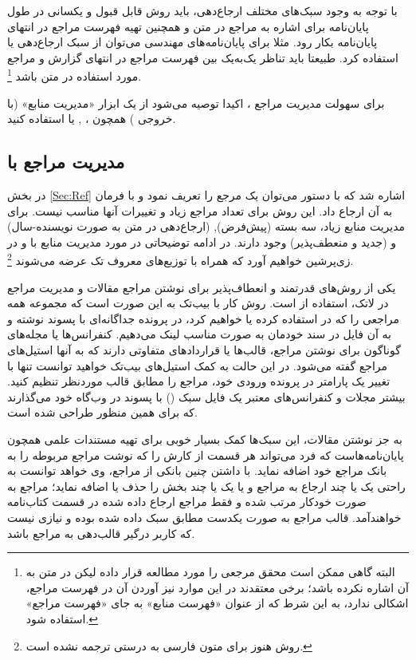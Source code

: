 با توجه به وجود سبک‌های مختلف ارجاع‌دهی، باید
روش قابل قبول و یکسانی
در طول پایان‌نامه برای اشاره به مراجع در متن و همچنین تهیه فهرست مراجع در انتهای پایان‌نامه بکار رود. مثلا برای پایان‌نامه‌های مهندسی می‌توان از سبک ارجاع‌دهی
%
یا
استفاده کرد. طبیعتا باید تناظر یک‌به‌یک بین فهرست مراجع در انتهای گزارش و مراجع مورد استفاده در متن باشد%
\footnote{البته گاهی ممکن است محقق مرجعی را مورد مطالعه قرار داده لیکن در متن به آن اشاره نکرده باشد؛ برخی معتقدند در این موارد نیز آوردن آن در فهرست مراجع، اشکالی ندارد، به این شرط که از عنوان «فهرست منابع» به جای «فهرست مراجع» استفاده شود.}.

برای سهولت مدیریت مراجع \پ%
، اکیدا توصیه می‌شود از یک ابزار «مدیریت منابع» (با خروجی
\texorpdfstring{}{Bib\TeX}%
) همچون
،
,
یا
استفاده کنید.

\subsection{ مدیریت مراجع با \texorpdfstring{}{Bib\TeX}}
در بخش \ref{Sec:Ref} اشاره شد که با دستور
 می‌توان یک مرجع را تعریف نمود و با فرمان
 به آن ارجاع داد. این روش برای تعداد مراجع زیاد و تغییرات آنها مناسب نیست. برای مدیریت منابع زیاد، سه بسته
 (پیش‌فرض),
(ارجاع‌دهی در متن به صورت نویسنده-سال)
و  (جدید و منعطف‌پذیر)
وجود دارند. در ادامه توضیحاتی در مورد مدیریت منابع با  و  در زی‌پرشین خواهیم آورد که همراه با توزیع‌های معروف تک عرضه می‌شوند
\footnote{روش  هنوز برای متون فارسی به درستی ترجمه نشده است.}.

یکی از روش‌های قدرتمند و انعطاف‌پذیر برای نوشتن مراجع مقالات و مدیریت مراجع در لاتک، استفاده از  است.
 روش کار با بیب‌تک به این صورت است که مجموعه همه مراجعی را که در \پ استفاده کرده یا خواهیم کرد،
در پرونده جداگانه‌ای با پسوند
نوشته و به آن فایل در سند خودمان به صورت مناسب لینک می‌دهیم.
 کنفرانس‌ها یا مجله‌های گوناگون برای نوشتن مراجع، قالب‌ها یا قراردادهای متفاوتی دارند که به آنها استیل‌های مراجع گفته می‌شود.
 در این حالت به کمک ‌استیل‌های بیب‌تک خواهید توانست تنها با تغییر یک پارامتر در پرونده ورودی خود، مراجع را مطابق قالب موردنظر تنظیم کنید.
 بیشتر مجلات و کنفرانس‌های معتبر یک فایل سبک
 ()
با پسوند  در وب‌گاه خود می‌گذارند که برای همین منظور طراحی شده است.

به جز نوشتن مقالات، این سبک‌ها کمک بسیار خوبی برای تهیه مستندات علمی همچون پایان‌نامه‌هاست که فرد می‌تواند هر قسمت از کارش را که نوشت مراجع مربوطه را به بانک مراجع خود اضافه نماید. با داشتن چنین بانکی از مراجع، وی خواهد توانست به راحتی یک یا چند ارجاع به مراجع و یا یک یا چند بخش را حذف یا اضافه ‌نماید؛
مراجع به صورت خودکار مرتب شده و
فقط مراجع ارجاع داده شده در قسمت کتاب‌نامه خواهندآمد.
قالب مراجع به صورت یکدست مطابق سبک داده شده بوده و نیازی نیست که کاربر درگیر قالب‌دهی به مراجع باشد.

